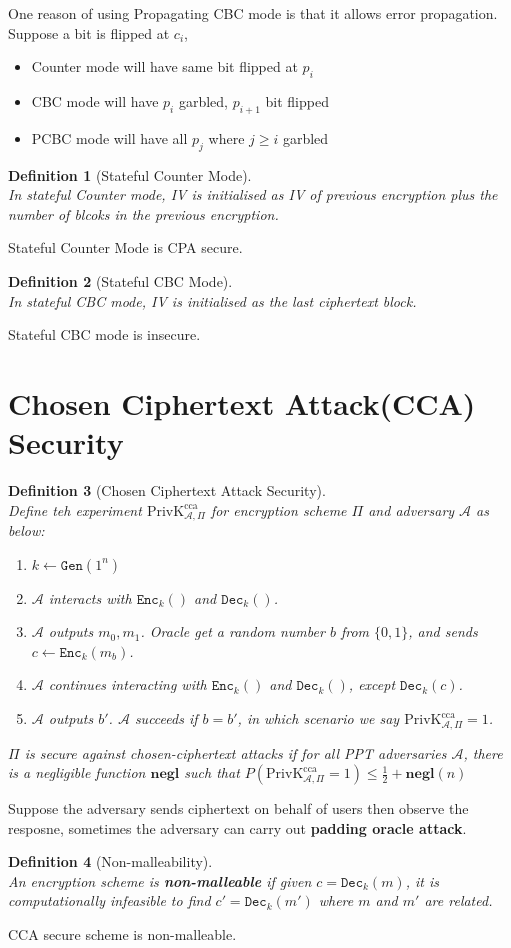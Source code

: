 \documentclass[12pt]{article}
\newcommand\PrivK{\mathrm{PrivK}}
\newtheorem{definition}{Definition}[section]
\theoremstyle{definition}
\begin{document}
One reason of using Propagating CBC mode is that it allows error propagation. Suppose a bit is flipped at $c_i$,
\begin{itemize}
  \item Counter mode will have same bit flipped at $p_i$
  \item CBC mode will have $p_i$ garbled, $p_{i+1}$ bit flipped
  \item PCBC mode will have all $p_j$ where $j\geq i$ garbled
\end{itemize}
\begin{definition}[Stateful Counter Mode]
\hfill\\\normalfont In stateful Counter mode, IV is initialised as IV of previous encryption plus the number of blcoks in the previous encryption.
\end{definition}
Stateful Counter Mode is CPA secure.
\begin{definition}[Stateful CBC Mode]
\hfill\\\normalfont In stateful CBC mode, IV is initialised as the last ciphertext block.
\end{definition}
Stateful CBC mode is insecure.

\section{Chosen Ciphertext Attack(CCA) Security}
\begin{definition}[Chosen Ciphertext Attack Security]
\hfill\\\normalfont Define teh experiment $\PrivK_{\mathcal{A},\Pi}^\text{cca}$ for encryption scheme $\Pi$ and adversary $\mathcal{A}$ as below:
\begin{enumerate}
  \item $k\leftarrow \texttt{Gen}(1^n)$
  \item $\mathcal{A}$ interacts with $\texttt{Enc}_k()$ and $\texttt{Dec}_k()$.
  \item $\mathcal{A}$ outputs $m_0, m_1$. Oracle get a random number $b$ from $\{0,1\}$, and sends $c\leftarrow \texttt{Enc}_k(m_b)$.
  \item $\mathcal{A}$ continues interacting with $\texttt{Enc}_k()$ and $\texttt{Dec}_k()$, except $\texttt{Dec}_k(c)$.
  \item $\mathcal{A}$ outputs $b'$. $\mathcal{A}$ succeeds if $b=b'$, in which scenario we say $\PrivK_{\mathcal{A},\Pi}^\text{cca}=1$.
\end{enumerate}
$\Pi$ is secure against chosen-ciphertext attacks if for all PPT adversaries $\mathcal{A}$, there is a negligible function $\mathbf{negl}$ such that 
$
P(\PrivK_{\mathcal{A},\Pi}^\text{cca}=1)\leq \frac{1}{2}+\mathbf{negl}(n)
$
\end{definition}
Suppose the adversary sends ciphertext on behalf of users then observe the resposne, sometimes the adversary can carry out \textbf{padding oracle attack}.
\begin{definition}[Non-malleability]
\hfill\\\normalfont An encryption scheme is \textbf{non-malleable} if given $c=\texttt{Dec}_k(m)$, it is computationally infeasible to find $c'=\texttt{Dec}_k(m')$ where $m$ and $m'$ are related.
\end{definition}
CCA secure scheme is non-malleable.
\end{document}
